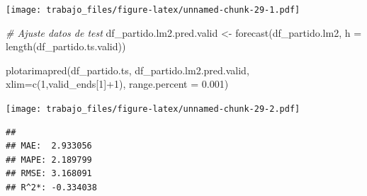 \documentclass[
]{article}
\newenvironment{Shaded}{\begin{snugshade}}{\end{snugshade}}
\newcommand{\AttributeTok}[1]{\textcolor[rgb]{0.77,0.63,0.00}{#1}}
\newcommand{\CommentTok}[1]{\textcolor[rgb]{0.56,0.35,0.01}{\textit{#1}}}
\newcommand{\DecValTok}[1]{\textcolor[rgb]{0.00,0.00,0.81}{#1}}
\newcommand{\FloatTok}[1]{\textcolor[rgb]{0.00,0.00,0.81}{#1}}
\newcommand{\FunctionTok}[1]{\textcolor[rgb]{0.00,0.00,0.00}{#1}}
\newcommand{\NormalTok}[1]{#1}
\newcommand{\OtherTok}[1]{\textcolor[rgb]{0.56,0.35,0.01}{#1}}
\newcommand{\SpecialCharTok}[1]{\textcolor[rgb]{0.00,0.00,0.00}{#1}}
\newcommand{\StringTok}[1]{\textcolor[rgb]{0.31,0.60,0.02}{#1}}
\begin{document}
\begin{Shaded}
\end{Shaded}

\texttt{[image: trabajo\_files/figure-latex/unnamed-chunk-29-1.pdf]}

\begin{Shaded}
\begin{Highlighting}[]
\CommentTok{\# Ajuste datos de test}
\NormalTok{df\_partido.lm2.pred.valid }\OtherTok{\textless{}{-}} \FunctionTok{forecast}\NormalTok{(df\_partido.lm2, }\AttributeTok{h =} \FunctionTok{length}\NormalTok{(df\_partido.ts.valid))}

\FunctionTok{plotarimapred}\NormalTok{(df\_partido.ts, df\_partido.lm2.pred.valid, }\AttributeTok{xlim=}\FunctionTok{c}\NormalTok{(}\DecValTok{1}\NormalTok{,valid\_ends[}\DecValTok{1}\NormalTok{]}\SpecialCharTok{+}\DecValTok{1}\NormalTok{), }\AttributeTok{range.percent =} \FloatTok{0.001}\NormalTok{)}
\end{Highlighting}
\end{Shaded}

\texttt{[image: trabajo\_files/figure-latex/unnamed-chunk-29-2.pdf]}

\begin{Shaded}
\end{Shaded}

\begin{verbatim}
## 
## MAE:  2.933056 
## MAPE: 2.189799 
## RMSE: 3.168091 
## R^2*: -0.334038
\end{verbatim}
\end{document}
